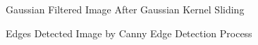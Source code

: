 \documentclass[oneside,a4paper,12pt]{report}
\begin{document}
\begin{center}
\begin{enumerate}
\begin{center}
\begin{figure}[!htbp]
\end{figure}
\end{center}
\begin{center}
\begin{figure}[!htbp]
\caption{Gaussian Filtered Image After Gaussian Kernel Sliding}
\end{figure}
\end{center}
\begin{center}
\begin{figure}[!htbp]
\caption{Edges Detected Image by Canny Edge Detection Process}
\end{figure}

\end{center}
\end{enumerate}
\end{center}
\end{document}
